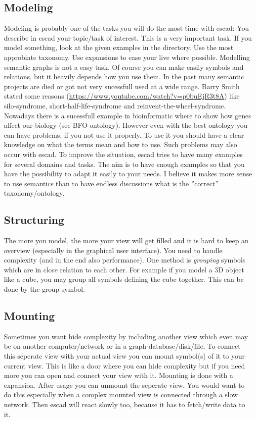 \documentclass[a4paper, 12pt, openany]{scrbook}
\begin{document}
\subsection{Modeling}
Modeling is probably one of the tasks you will do the most time with escad: You describe in escad your topic/task of interest. This is a very important task. If you model something, look at the given examples in the  directory. Use the most approbiate taxonomy. Use expansions to ease your live where possible.
Modelling semantic graphs is not a easy task. Of course you can make easily symbols and relations, but it heavily depends how you use them. In the past many semantic projects are died or got not very sucessfull used at a wide range. Barry Smith stated some reasons (\url{https://www.youtube.com/watch?v=p0buEjR3t8A}) like silo-syndrome, short-half-life-syndrome and reinvent-the-wheel-syndrome. Nowadays there is a sucessfull example in bioinformatic where to show how genes affect our biology (see BFO-ontology). However even with the best ontology you can have problems, if you not use it properly. To use it you should have a clear knowledge on what the terms mean and how to use.
Such problems may also occur with escad. To improve the situation, escad tries to have many examples for several domains and tasks. The aim is to have enough examples so that you have the possibility to adapt it easily to your needs. I believe it makes more sense to use semantics than to have endless discussions what is the ''correct'' taxonomy/ontology.
\subsection{Structuring}
The more you model, the more your view will get filled and it is hard to keep an overview (especially in the graphical user interface). You need to handle complexity (and in the end also performance). One method is \emph{grouping} symbols which are in close relation to each other. For example if you model a 3D object like a cube, you may group all symbols defining the cube together. This can be done by the group-symbol.
\subsection{Mounting}
Sometimes you want hide complexity by including another view which even may be on another computer/network or in a graph-database/disk/file. To connect this seperate view with your actual view you can mount symbol(s) of it to your current view. This is like a door where you can hide complexity but if you need more you can open and connect your view with it. Mounting is done with a expansion. After usage you can unmount the seperate view. You would want to do this especially when a complex mounted view is connected through a slow network. Then escad will react slowly too, because it has to fetch/write data to it.
\end{document}
